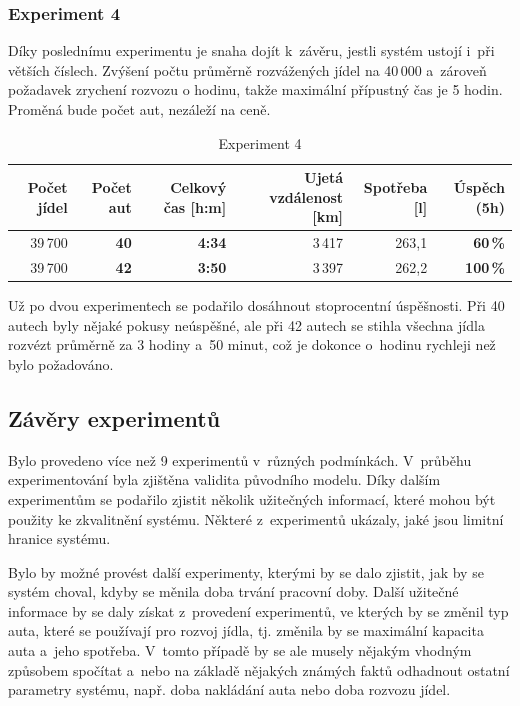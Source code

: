 \documentclass[a4paper, 11pt]{article}
\begin{document}
	\subsubsection{Experiment 4}

	Díky poslednímu experimentu je snaha dojít k~závěru, jestli systém ustojí
	i~při větších číslech. Zvýšení počtu průměrně rozvážených jídel na 40\,000
	a~zároveň požadavek zrychení rozvozu o hodinu, takže maximální přípustný
	čas je 5 hodin. Proměná bude počet aut, nezáleží na ceně.

	\begin{table}[ht]
		\centering
		\begin{tabular}{|r|r|r|r|r|r|}
			\hline
			Počet jídel & \textbf{Počet aut} & \textbf{Celkový čas [h:m]}
				& Ujetá vzdálenost [km] & Spotřeba [l]
				& \textbf{Úspěch (5h)} \\ \hline

			39\,700 & \textbf{40} & \textbf{4:34} & 3\,417 & 263,1
				& \textbf{60\,\%} \\ \hline

			39\,700 & \textbf{42} & \textbf{3:50} & 3\,397 & 262,2
				& \textbf{100\,\%} \\ \hline
		\end{tabular}

		\caption{Experiment 4}
		\label{table:experiment4}
	\end{table}

	Už po dvou experimentech se podařilo dosáhnout stoprocentní úspěšnosti. Při
	40 autech byly nějaké pokusy neúspěšné, ale při 42 autech se stihla všechna
	jídla rozvézt průměrně za 3 hodiny a~50 minut, což je dokonce o~hodinu
	rychleji než bylo požadováno.


	\subsection{Závěry experimentů}

	Bylo provedeno více než 9 experimentů v~různých podmínkách. V~průběhu
	experimentování byla zjištěna validita původního modelu. Díky dalším
	experimentům se podařilo zjistit několik užitečných informací, které
	mohou být použity ke zkvalitnění systému. Některé z~experimentů ukázaly,
	jaké jsou limitní hranice systému.

	Bylo by možné provést další experimenty, kterými by se dalo zjistit,
	jak by se systém choval, kdyby se měnila doba trvání pracovní doby.
	Další užitečné informace by se daly získat z~provedení experimentů,
	ve kterých by se změnil typ auta, které se používají pro rozvoj jídla,
	tj. změnila by se maximální kapacita auta a~jeho spotřeba. V~tomto
	případě by se ale musely nějakým vhodným způsobem spočítat a~nebo na
	základě nějakých známých faktů odhadnout ostatní parametry systému, např.
	doba nakládání auta nebo doba rozvozu jídel.
\end{document}
